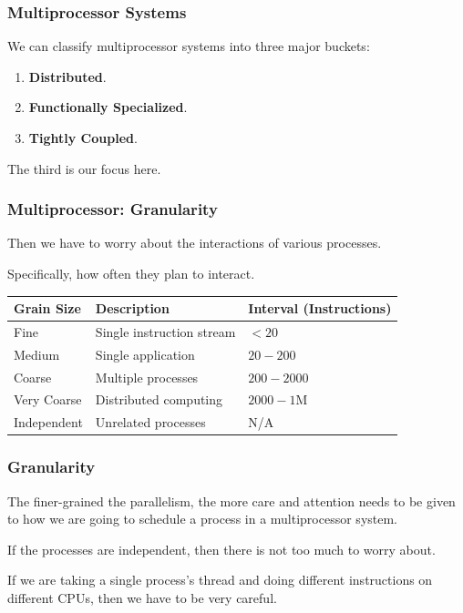 \begin{frame}
\frametitle{Multiprocessor Systems}

We can classify multiprocessor systems into three major buckets:

\begin{enumerate}
	\item \textbf{Distributed}.
	\item \textbf{Functionally Specialized}.
	\item \textbf{Tightly Coupled}.
\end{enumerate}

The third is our focus here.

\end{frame}

\begin{frame}
\frametitle{Multiprocessor: Granularity}

Then we have to worry about the interactions of various processes.

Specifically, how often they plan to interact.

\begin{center}
\begin{tabular}{l|l|l}
	\textbf{Grain Size} & \textbf{Description} & \textbf{Interval (Instructions)}\\ \hline
	Fine & Single instruction stream & $< 20$ \\\hline
	Medium & Single application & $20 - 200$ \\\hline
	Coarse & Multiple processes & $200 - 2000$ \\\hline
	Very Coarse & Distributed computing & $2000 - 1$M \\\hline
	Independent & Unrelated processes & N/A \\

\end{tabular}
\end{center}

\end{frame}

\begin{frame}
\frametitle{Granularity}

The finer-grained the parallelism, the more care and attention needs to be given to how we are going to schedule a process in a multiprocessor system. 

If the processes are independent, then there is not too much to worry about. 

If we are taking a single process's thread and doing different instructions on different CPUs, then we have to be very careful.

\end{frame}

